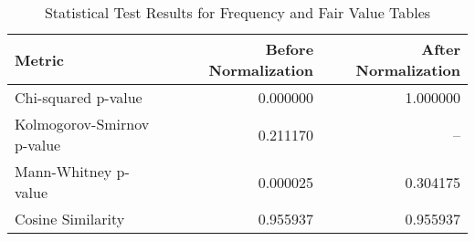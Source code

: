 \begin{table}[h!]
\centering
\caption{Statistical Test Results for Frequency and Fair Value Tables}
\label{table:stat_results}
\begin{tabular}{lrr}
\toprule
\textbf{Metric} & \textbf{Before Normalization} & \textbf{After Normalization} \\
\midrule
Chi-squared p-value & 0.000000 & 1.000000 \\
Kolmogorov-Smirnov p-value & 0.211170 & -- \\
Mann-Whitney p-value & 0.000025 & 0.304175 \\
Cosine Similarity & 0.955937 & 0.955937 \\
\bottomrule
\end{tabular}
\end{table}
